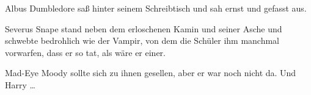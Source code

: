 Albus Dumbledore saß hinter seinem Schreibtisch und sah ernst und gefasst aus.

Severus Snape stand neben dem erloschenen Kamin und seiner Asche und schwebte bedrohlich wie der Vampir, von dem die Schüler ihm manchmal vorwarfen, dass er so tat, als wäre er einer.


Mad-Eye Moody sollte sich zu ihnen gesellen, aber er war noch nicht da.
Und Harry …


